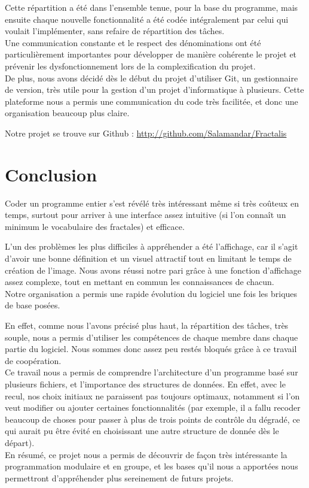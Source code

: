 \documentclass[a4paper,11pt]{article} \usepackage[T1]{fontenc} \usepackage[utf8]{inputenc} \usepackage[francais]{babel}
\begin{document}
Cette répartition a été dans l'ensemble tenue, pour la base du programme, mais ensuite chaque nouvelle fonctionnalité a été codée intégralement par celui qui voulait l'implémenter, sans refaire de répartition des tâches.\\

Une communication constante et le respect des dénominations ont été particulièrement importantes pour développer de manière cohérente le projet et prévenir les dysfonctionnement lors de la complexification du projet.\\

De plus, nous avons décidé dès le début du projet d'utiliser Git, un gestionnaire de version, très utile pour la gestion d'un projet d'informatique à plusieurs. Cette plateforme nous a permis une communication du code très facilitée, et donc une organisation beaucoup plus claire.

Notre projet se trouve sur Github : \url{http://github.com/Salamandar/Fractalis}



\section{Conclusion}
Coder un programme entier s'est révélé très intéressant même si très coûteux en temps, surtout pour arriver à une interface assez intuitive (si l'on connaît un minimum le vocabulaire des fractales) et efficace.

L'un des problèmes les plus difficiles à appréhender a été l'affichage, car il s'agit d'avoir une bonne définition et un visuel attractif tout en limitant le temps de création de l'image. Nous avons réussi notre pari grâce à une fonction d'affichage assez complexe, tout en mettant en commun les connaissances de chacun.\\

Notre organisation a permis une rapide évolution du logiciel une fois les briques de base posées.

En effet, comme nous l'avons précisé plus haut, la répartition des tâches, très souple, nous a permis d'utiliser les compétences de chaque membre dans chaque partie du logiciel. Nous sommes donc assez peu restés bloqués grâce à ce travail de coopération.\\

Ce travail nous a permis de comprendre l'architecture d'un programme basé sur plusieurs fichiers, et l'importance des structures de données. En effet, avec le recul, nos choix initiaux ne paraissent pas toujours optimaux, notamment si l'on veut modifier ou ajouter certaines fonctionnalités (par exemple, il a fallu recoder beaucoup de choses pour passer à plus de trois points de contrôle du dégradé, ce qui aurait pu être évité en choisissant une autre structure de donnée dès le départ).\\

En résumé, ce projet nous a permis de découvrir de façon très intéressante la programmation modulaire et en groupe, et les bases qu'il nous a apportées nous permettront d'appréhender plus sereinement de futurs projets.
\end{document}
